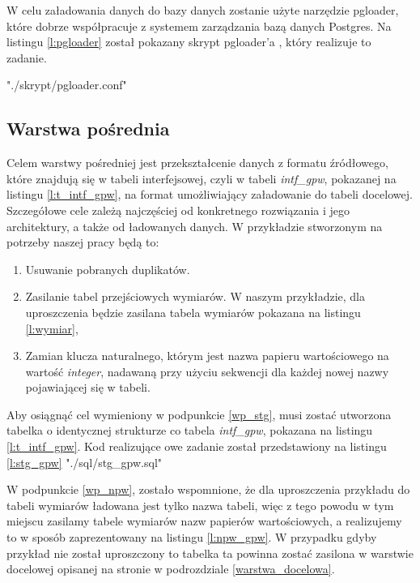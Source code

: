 W celu załadowania danych do bazy danych zostanie użyte narzędzie pgloader,
 które dobrze współpracuje z systemem zarządzania bazą danych Postgres.
Na listingu \ref{l:pgloader} został pokazany skrypt pgloader'a , który realizuje to zadanie.

 {"./skrypt/pgloader.conf"}


\subsection{Warstwa pośrednia}

Celem warstwy pośredniej jest przekształcenie danych z formatu źródłowego, które znajdują się w tabeli interfejsowej,
czyli w tabeli \textit{intf\_gpw}, pokazanej na listingu \ref{l:t_intf_gpw},
na format umożliwiający załadowanie do tabeli docelowej.
Szczegółowe cele zależą najczęściej od konkretnego rozwiązania i jego architektury,
 a także od ładowanych danych. 
W przykładzie stworzonym na potrzeby naszej pracy będą to:
\begin{enumerate}
 \item \label{wp_stg}
   Usuwanie pobranych duplikatów.
 \item \label{wp_npw}
  Zasilanie tabel przejściowych wymiarów.
  W naszym przykładzie, dla uproszczenia będzie zasilana tabela wymiarów pokazana na listingu \ref{l:wymiar},
 \item  \label{wp_promo}
  Zamian klucza naturalnego, 
   którym jest nazwa papieru wartościowego na wartość \textit{integer}, 
   nadawaną przy użyciu  sekwencji dla każdej nowej nazwy pojawiającej się w tabeli.
\end{enumerate}

Aby osiągnąć cel wymieniony w  podpunkcie \ref{wp_stg}, 
 musi zostać utworzona tabelka 
 o identycznej strukturze co tabela \textit{intf\_gpw}, pokazana na listingu \ref{l:t_intf_gpw}.
Kod realizujące owe zadanie został przedstawiony na listingu \ref{l:stg_gpw}
 {"./sql/stg_gpw.sql"}


W podpunkcie \ref{wp_npw}, zostało wspomnione, 
 że dla uproszczenia przykładu do tabeli wymiarów ładowana jest tylko nazwa tabeli, 
 więc z tego powodu w tym miejscu zasilamy tabele wymiarów nazw papierów wartościowych, 
 a realizujemy to w sposób zaprezentowany na listingu \ref{l:npw_gpw}.
W przypadku gdyby przykład nie został uproszczony to tabelka ta powinna zostać zasilona w warstwie docelowej opisanej na stronie
\pageref{warstwa_docelowa} w podrozdziale  \ref{warstwa_docelowa}.

